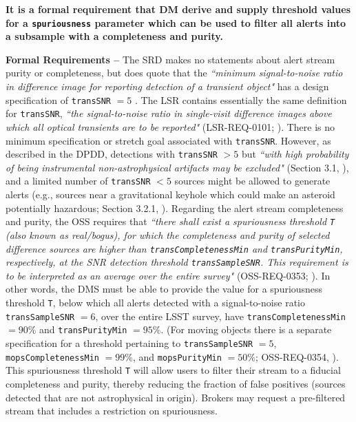 \documentclass[DM,authoryear,toc]{lsstdoc}
\begin{document}
{\bf It is a formal requirement that DM derive and supply threshold values for a {\tt spuriousness} parameter which can be used to filter all alerts into a subsample with a completeness and purity.}

{\bf Formal Requirements --} The SRD makes no statements about alert stream purity or completeness, but does quote that the {\it ``minimum signal-to-noise ratio in difference image for reporting detection of a transient object"} has a design specification of {\tt transSNR} $=5$ . The LSR contains essentially the same definition for {\tt transSNR}, {\it ``the signal-to-noise ratio in single-visit difference images above which all optical transients are to be reported"} (LSR-REQ-0101; ). There is no minimum specification or stretch goal associated with {\tt transSNR}. However, as described in the DPDD, detections with {\tt transSNR} $>5$ but {\it ``with high probability of being instrumental non-astrophysical artifacts may be excluded"} (Section 3.1, ), and a limited number of {\tt transSNR} $<5$ sources might be allowed to generate alerts (e.g., sources near a gravitational keyhole which could make an asteroid potentially hazardous; Section 3.2.1, ). Regarding the alert stream completeness and purity, the OSS requires that {\it ``there shall exist a spuriousness threshold {\tt T} (also known as {\it real/bogus}), for which the completeness and purity of selected difference sources are higher than {\tt transCompletenessMin} and {\tt transPurityMin}, respectively, at the SNR detection threshold {\tt transSampleSNR}. This requirement is to be interpreted as an average over the entire survey"} (OSS-REQ-0353; ). In other words, the DMS must be able to provide the value for a spuriousness threshold {\tt T}, below which all alerts detected with a signal-to-noise ratio {\tt transSampleSNR} $=6$, over the entire LSST survey, have {\tt transCompletenessMin} $=90\%$ and {\tt transPurityMin} $=95\%$. (For moving objects there is a separate specification for a threshold pertaining to {\tt transSampleSNR} $=5$, {\tt mopsCompletenessMin} $=99\%$, and {\tt mopsPurityMin} $=50\%$; OSS-REQ-0354, ). This spuriousness threshold {\tt T} will allow users to filter their stream to a fiducial completeness and purity, thereby reducing the fraction of false positives (sources detected that are not astrophysical in origin). Brokers may request a pre-filtered stream that includes a restriction on spuriousness.
\end{document}
